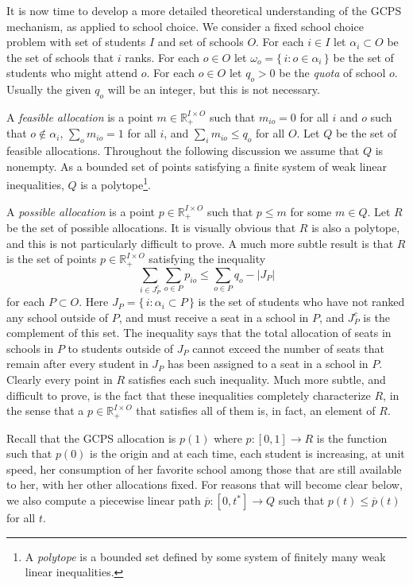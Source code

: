 \documentclass[12pt]{article}
\theoremstyle{definition}
\renewcommand{\Re}{\mathbb{R}}
\newcommand{\barp}{\overline{p}}
\begin{document}
\begin{appendix}
It is now time to develop a more detailed theoretical understanding of
the GCPS mechanism, as applied to school choice.  We consider a fixed
school choice problem with set of students $I$ and set of schools $O$.
For each $i \in I$ let $\alpha_i \subset O$ be the set of schools that
$i$ ranks. For each $o \in O$ let $\omega_o = \{\, i : o \in \alpha_i
\,\}$ be the set of students who might attend $o$. For each $o \in O$
let $q_o > 0$ be the \emph{quota} of school $o$.  Usually the given
$q_o$ will be an integer, but this is not necessary.

A \emph{feasible allocation} is a point $m \in \Re^{I \times O}_+$
such that $m_{io} = 0$ for all $i$ and $o$ such that $o \notin
\alpha_i$, $\sum_o m_{io} = 1$ for all $i$, and $\sum_i m_{io} \le
q_o$ for all $O$. Let $Q$ be the set of feasible allocations.
Throughout the following discussion we assume that $Q$ is nonempty.
As a bounded set of points satisfying a finite system of weak linear
inequalities, $Q$ is a polytope\footnote{A \emph{polytope} is a
bounded set defined by some system of finitely many weak linear
inequalities.}.

A \emph{possible allocation} is a point $p \in \Re^{I \times O}_+$
such that $p \le m$ for some $m \in Q$.  Let $R$ be the set of
possible allocations.  It is visually obvious that $R$ is also a
polytope, and this is not particularly difficult to prove.  A much
more subtle result is that $R$ is the set of points $p \in \Re^{I
  \times O}_+$ satisfying the inequality
$$\sum_{i \in J_P^c}\sum_{o \in P} p_{io} \le \sum_{o \in P} q_o -
|J_P|$$ for each $P \subset O$.  Here $J_P = \{\, i : \alpha_i \subset
P \,\}$ is the set of students who have not ranked any school outside
of $P$, and must receive a seat in a school in $P$, and $J_P^c$ is the
complement of this set.  The inequality says that the total allocation
of seats in schools in $P$ to students outside of $J_P$ cannot exceed
the number of seats that remain after every student in $J_P$ has been
assigned to a seat in a school in $P$.  Clearly every point in $R$
satisfies each such inequality.  Much more subtle, and difficult to
prove, is the fact that these inequalities completely characterize
$R$, in the sense that a $p \in \Re^{I \times O}_+$ that satisfies all
of them is, in fact, an element of $R$.

Recall that the GCPS allocation is $p(1)$ where $p \colon [0,1] \to R$
is the function such that $p(0)$ is the origin and at each time, each
student is increasing, at unit speed, her consumption of her favorite
school among those that are still available to her, with her other
allocations fixed.  For reasons that will become clear below, we also
compute a piecewise linear path $\barp \colon [0,t^*] \to Q$ such that
$p(t) \le \barp(t)$ for all $t$.


\end{appendix}
\end{document}
